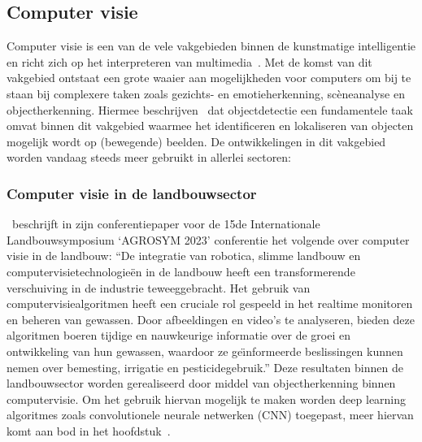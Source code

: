 \subsection{Computer visie}\label{subsec:de-kern-van-objectdetectie}
Computer visie is een van de vele vakgebieden binnen de kunstmatige intelligentie en richt zich op het interpreteren van multimedia~\autocite{Moin2023}.
Met de komst van dit vakgebied ontstaat een grote waaier aan mogelijkheden voor computers om bij te staan bij complexere taken zoals gezichts- en emotieherkenning, sc\`eneanalyse en objectherkenning.
Hiermee beschrijven~\textcite{Tasnim2023} dat objectdetectie een fundamentele taak omvat binnen dit vakgebied waarmee het identificeren en lokaliseren van objecten mogelijk wordt op (bewegende) beelden.
De ontwikkelingen in dit vakgebied worden vandaag steeds meer gebruikt in allerlei sectoren:

\subsubsection{Computer visie in de landbouwsector}
\textcite{Radojcic2023}~beschrijft in zijn conferentiepaper voor de 15de Internationale Landbouwsymposium `AGROSYM 2023' conferentie het volgende over computer visie in de landbouw:
``De integratie van robotica, slimme landbouw en computervisietechnologie\"en in de landbouw heeft een transformerende verschuiving in de industrie teweeggebracht.
Het gebruik van computervisiealgoritmen heeft een cruciale rol gespeeld in het realtime monitoren en beheren van gewassen.
Door afbeeldingen en video's te analyseren, bieden deze algoritmen boeren tijdige en nauwkeurige informatie over de groei en ontwikkeling van hun gewassen, waardoor ze ge\"{\i}nformeerde beslissingen kunnen nemen over bemesting, irrigatie en pesticidegebruik.''
Deze resultaten binnen de landbouwsector worden gerealiseerd door middel van objectherkenning binnen computervisie.
Om het gebruik hiervan mogelijk te maken worden deep learning algoritmes zoals convolutionele neurale netwerken (CNN) toegepast, meer hiervan komt aan bod in het hoofdstuk~.

